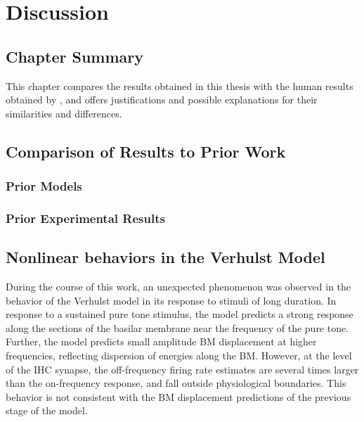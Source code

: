 \chapter{Discussion}
\label{chapter:Discussion}
\thispagestyle{myheadings}

\graphicspath{{6_Discussion/Figures/}}
\section{Chapter Summary} %
\label{sec:discussion_summary}
This chapter compares the results obtained in this thesis with the human results obtained by \citeauthor{Mehraei2016Auditory}, and offers justifications and possible explanations for their similarities and differences.

\section{Comparison of Results to Prior Work} %
\label{sec:comparison_of_results_to_prior_work}
\subsection{Prior Models} %
\label{sub:prior_models}

\subsection{Prior Experimental Results} %
\label{sub:prior_experimental_results}


\section{Nonlinear behaviors in the Verhulst Model} %
\label{sec:nonlinear_behaviors_in_the_verhulst_model}
During the course of this work, an unexpected phenomenon was observed in the behavior of the Verhulst model in its response to stimuli of long duration.  In response to a sustained pure tone stimulus, the model predicts a strong response along the sections of the basilar membrane near the frequency of the pure tone.  Further, the model predicts small amplitude BM displacement at higher frequencies, reflecting dispersion of energies along the BM.  However, at the level of the IHC synapse, the off-frequency firing rate estimates are several times larger than the on-frequency response, and fall outside physiological boundaries. This behavior is not consistent with the BM displacement predictions of the previous stage of the model.  

